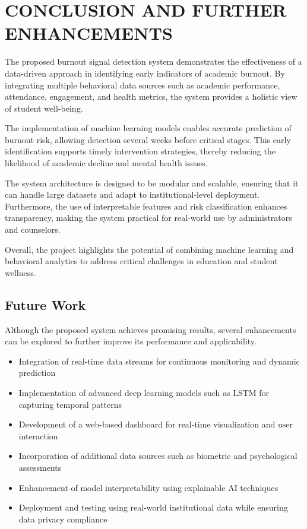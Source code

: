 \chapter{\MakeUppercase{Conclusion and Further enhancements}} 

The proposed burnout signal detection system demonstrates the effectiveness of a data-driven approach in identifying early indicators of academic burnout. By integrating multiple behavioral data sources such as academic performance, attendance, engagement, and health metrics, the system provides a holistic view of student well-being.

The implementation of machine learning models enables accurate prediction of burnout risk, allowing detection several weeks before critical stages. This early identification supports timely intervention strategies, thereby reducing the likelihood of academic decline and mental health issues.

The system architecture is designed to be modular and scalable, ensuring that it can handle large datasets and adapt to institutional-level deployment. Furthermore, the use of interpretable features and risk classification enhances transparency, making the system practical for real-world use by administrators and counselors.

Overall, the project highlights the potential of combining machine learning and behavioral analytics to address critical challenges in education and student wellness.

\section{Future Work}

Although the proposed system achieves promising results, several enhancements can be explored to further improve its performance and applicability.

\begin{itemize}
    \item Integration of real-time data streams for continuous monitoring and dynamic prediction
    \item Implementation of advanced deep learning models such as LSTM for capturing temporal patterns
    \item Development of a web-based dashboard for real-time visualization and user interaction
    \item Incorporation of additional data sources such as biometric and psychological assessments
    \item Enhancement of model interpretability using explainable AI techniques
    \item Deployment and testing using real-world institutional data while ensuring data privacy compliance
\end{itemize}